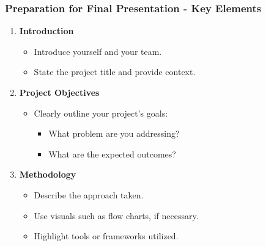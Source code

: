 \documentclass{beamer}
\begin{document}
\begin{frame}[fragile]
    \frametitle{Preparation for Final Presentation - Key Elements}
    \begin{enumerate}
        \item \textbf{Introduction}
            \begin{itemize}
                \item Introduce yourself and your team.
                \item State the project title and provide context.
            \end{itemize}

        \item \textbf{Project Objectives}
            \begin{itemize}
                \item Clearly outline your project's goals:
                    \begin{itemize}
                        \item What problem are you addressing?
                        \item What are the expected outcomes?
                    \end{itemize}
            \end{itemize}

        \item \textbf{Methodology}
            \begin{itemize}
                \item Describe the approach taken.
                \item Use visuals such as flow charts, if necessary.
                \item Highlight tools or frameworks utilized.
            \end{itemize}
    \end{enumerate}
\end{frame}
\end{document}
